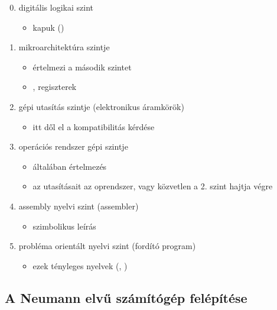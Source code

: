 \documentclass[../main.tex]{subfiles}
\begin{document}
\begin{enumerate}
	\setcounter{enumi}{-1}
	\item digitális logikai szint
	      \begin{itemize}
		      \item kapuk ()
	      \end{itemize}

	\item mikroarchitektúra  szintje
	      \begin{itemize}
		      \item értelmezi a második szintet
		      \item {}, regiszterek
	      \end{itemize}

	\item gépi utasítás szintje (elektronikus áramkörök)
	      \begin{itemize}
		      \item itt dől el a kompatibilitás kérdése
	      \end{itemize}

	\item operációs rendszer gépi szintje
	      \begin{itemize}
		      \item általában értelmezés
		      \item az utasításait az oprendszer,
		            vagy közvetlen a 2. szint hajtja végre
	      \end{itemize}

	\item assembly nyelvi szint (assembler)
	      \begin{itemize}
		      \item szimbolikus leírás
	      \end{itemize}

	\item probléma orientált nyelvi szint (fordító program)
	      \begin{itemize}
		      \item ezek tényleges nyelvek (, )
	      \end{itemize}
\end{enumerate}

\subsection*{A Neumann elvű számítógép felépítése}
\end{document}

